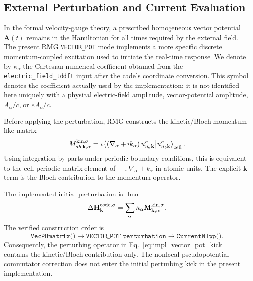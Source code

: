 \subsection{External Perturbation and Current Evaluation}
\label{sec:implementation-perturbation-current}

In the formal velocity-gauge theory, a prescribed homogeneous vector
potential $\mathbf A(t)$ remains in the Hamiltonian for all times
required by the external field.  The present RMG \texttt{VECTOR\_POT}
mode implements a more specific discrete momentum-coupled excitation
used to initiate the real-time response.  We denote by
$\kappa_\alpha$ the Cartesian numerical coefficient obtained from the
\texttt{electric\_field\_tddft} input after the code's coordinate
conversion.  This symbol denotes the coefficient actually used by the
implementation; it is not identified here uniquely with a physical
electric-field amplitude, vector-potential amplitude, $A_\alpha/c$, or
$eA_\alpha/c$.

Before applying the perturbation, RMG constructs the kinetic/Bloch
momentum-like matrix
\begin{equation}
  M_{ab,\mathbf k,\alpha}^{\rm kin,\sigma}
  =
  \imath
  \left\langle
    \left(\nabla_\alpha+\imath k_\alpha\right)
    u_{n_a\mathbf k}^{\sigma}
    \middle|
    u_{n_b\mathbf k}^{\sigma}
  \right\rangle_{\rm cell}.
  \label{eq:impl_mkin}
\end{equation}
Using integration by parts under periodic boundary conditions, this is
equivalent to the cell-periodic matrix element of
$-\imath\nabla_\alpha+k_\alpha$ in atomic units.  The explicit
$\mathbf k$ term is the Bloch contribution to the momentum operator.

The implemented initial perturbation is then
\begin{equation}
  \Delta\mathbf H_{\mathbf k}^{\rm code,\sigma}
  =
  \sum_\alpha
  \kappa_\alpha
  \mathbf M_{\mathbf k,\alpha}^{\rm kin,\sigma}.
  \label{eq:impl_vector_pot_kick}
\end{equation}
The verified construction order is
\[
  \texttt{VecPHmatrix()}
  \rightarrow
  \texttt{VECTOR\_POT\ perturbation}
  \rightarrow
  \texttt{CurrentNlpp()} .
\]
Consequently, the perturbing operator in
Eq.~\eqref{eq:impl_vector_pot_kick} contains the kinetic/Bloch
contribution only.  The nonlocal-pseudopotential commutator correction
does not enter the initial perturbing kick in the present
implementation.

